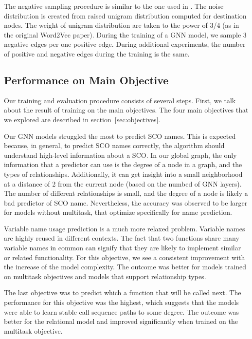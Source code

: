 \documentclass[a4paper,twoside]{article}
\begin{document}
The negative sampling procedure is similar to the one used in \cite{mikolov2013distributed}. The noise distribution is created from raised unigram distribution computed for destination nodes. The weight of unigram distribution are taken to the power of 3/4 (as in the original Word2Vec paper). During the training of a GNN model, we sample 3 negative edges per one positive edge. During additional experiments, the number of positive and negative edges during the training is the same.

\subsection{Performance on Main Objective}

Our training and evaluation procedure consists of several steps. First, we talk about the result of training on the main objectives. The four main objectives that we explored are described in section~\ref{sec:objectives}. 

Our GNN models struggled the most to predict SCO names. This is expected because, in general, to predict SCO names correctly, the algorithm should understand high-level information about a SCO\@. In our global graph, the only information that a predictor can use is the degree of a node in a graph, and the types of relationships. Additionally, it can get insight into a small neighborhood at a distance of 2 from the current node (based on the numbed of GNN layers). The number of different relationships is small, and the degree of a node is likely a bad predictor of SCO name. Nevertheless, the accuracy was observed to be larger for models without multitask, that optimize specifically for name prediction.

Variable name usage prediction is a much more relaxed problem. Variable names are highly reused in different contexts. The fact that two functions share many variable names in common can signify that they are likely to implement similar or related functionality. For this objective, we see a consistent improvement with the increase of the model complexity. The outcome was better for models trained on multitask objectives and models that support relationship types.

The last objective was to predict which a function that will be called next. The performance for this objective was the highest, which suggests that the models were able to learn stable call sequence paths to some degree. The outcome was better for the relational model and improved significantly when trained on the multitask objective. 
\end{document}
